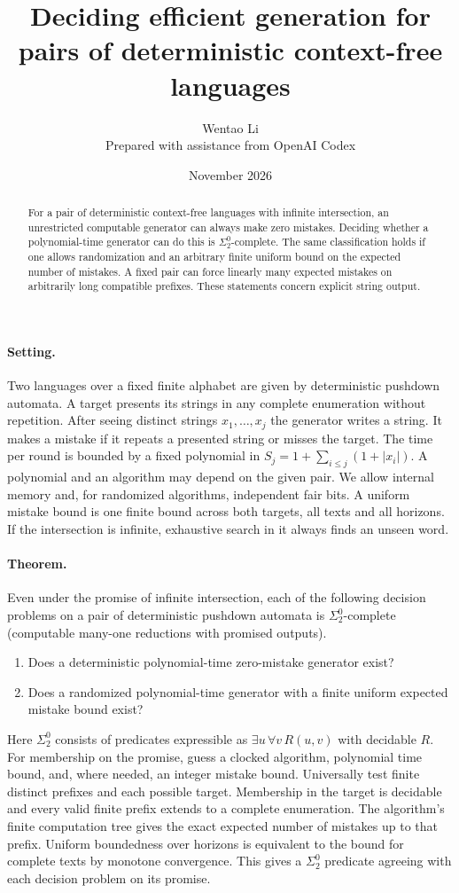 \documentclass[11pt]{article}
\title{Deciding efficient generation for pairs of deterministic context-free languages}
\author{Wentao Li\\[2pt]\small Prepared with assistance from OpenAI Codex}
\date{November 2026}
\begin{document}
\maketitle
\begin{abstract}
For a pair of deterministic context-free languages with infinite intersection, an unrestricted computable generator can always make zero mistakes. Deciding whether a polynomial-time generator can do this is $\Sigma^0_2$-complete. The same classification holds if one allows randomization and an arbitrary finite uniform bound on the expected number of mistakes. A fixed pair can force linearly many expected mistakes on arbitrarily long compatible prefixes. These statements concern explicit string output.
\end{abstract}

\paragraph{Setting.} Two languages over a fixed finite alphabet are given by deterministic pushdown automata. A target presents its strings in any complete enumeration without repetition. After seeing distinct strings $x_1,\ldots,x_j$ the generator writes a string. It makes a mistake if it repeats a presented string or misses the target. The time per round is bounded by a fixed polynomial in $S_j=1+\sum_{i\le j}(1+|x_i|)$. A polynomial and an algorithm may depend on the given pair. We allow internal memory and, for randomized algorithms, independent fair bits. A uniform mistake bound is one finite bound across both targets, all texts and all horizons. If the intersection is infinite, exhaustive search in it always finds an unseen word.

\paragraph{Theorem.} Even under the promise of infinite intersection, each of the following decision problems on a pair of deterministic pushdown automata is $\Sigma^0_2$-complete (computable many-one reductions with promised outputs).
\begin{enumerate}
\item Does a deterministic polynomial-time zero-mistake generator exist?
\item Does a randomized polynomial-time generator with a finite uniform expected mistake bound exist?
\end{enumerate}
Here $\Sigma^0_2$ consists of predicates expressible as $\exists u\,\forall v\,R(u,v)$ with decidable $R$. For membership on the promise, guess a clocked algorithm, polynomial time bound, and, where needed, an integer mistake bound. Universally test finite distinct prefixes and each possible target. Membership in the target is decidable and every valid finite prefix extends to a complete enumeration. The algorithm's finite computation tree gives the exact expected number of mistakes up to that prefix. Uniform boundedness over horizons is equivalent to the bound for complete texts by monotone convergence. This gives a $\Sigma^0_2$ predicate agreeing with each decision problem on its promise.
\end{document}
